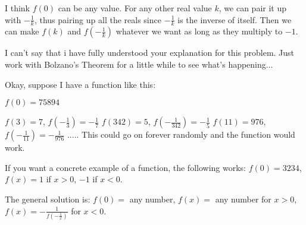 \begin{solution}
	\begin{tcolorbox}I think $ f(0)$ can be any value. For any other real value $ k$, we can pair it up with $ - \frac {1}{k}$, thus pairing up all the reals since $ - \frac {1}{k}$ is the inverse of itself. Then we can make $ f(k)$ and $ f( - \frac {1}{k})$ whatever we want as long as they multiply to $ - 1$.\end{tcolorbox}

I can't say that i have fully understood your explanation for this problem. Just work with Bolzano's Theorem for a little while to see what's happening...
\end{solution}



\begin{solution}
	Okay, suppose I have a function like this:

$ f(0) = 75894$

$ f(3) = 7$, $ f( - \frac {1}{3}) = - \frac {1}{7}$
$ f(342) = 5$, $ f( - \frac {1}{342}) = - \frac {1}{5}$
$ f(11) = 976$, $ f( - \frac {1}{11}) = - \frac {1}{976}$
.....
This could go on forever randomly and the function would work.

If you want a concrete example of a function, the following works:
$ f(0) = 3234$, $ f(x) = 1$ if $ x > 0$, $ - 1$ if $ x < 0$.

The general solution is:
$ f(0)=$ any number, $ f(x)=$ any number for $ x>0$, $ f(x)=-\frac{1}{f(-\frac{1}{x})}$ for $ x<0$.
\end{solution}



